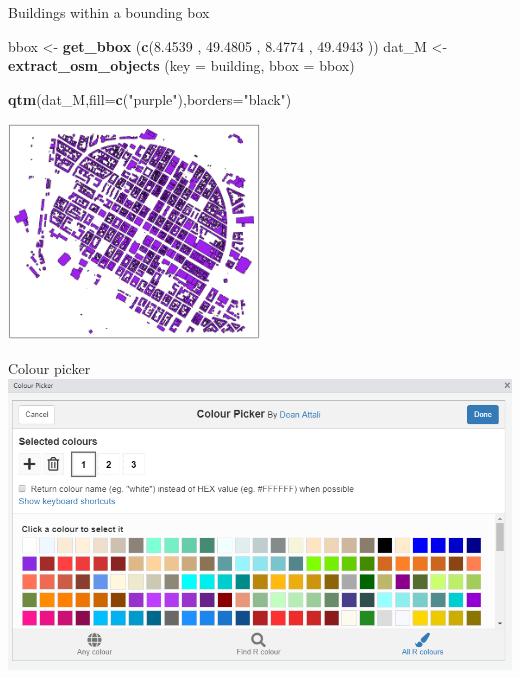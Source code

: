 \documentclass[
  ignorenonframetext,
]{beamer}
\newenvironment{Shaded}{\begin{snugshade}}{\end{snugshade}}
\newcommand{\DataTypeTok}[1]{\textcolor[rgb]{0.13,0.29,0.53}{#1}}
\newcommand{\FloatTok}[1]{\textcolor[rgb]{0.00,0.00,0.81}{#1}}
\newcommand{\KeywordTok}[1]{\textcolor[rgb]{0.13,0.29,0.53}{\textbf{#1}}}
\newcommand{\NormalTok}[1]{#1}
\newcommand{\StringTok}[1]{\textcolor[rgb]{0.31,0.60,0.02}{#1}}
\begin{document}
\begin{frame}[fragile]{Buildings within a bounding box}
\protect\hypertarget{buildings-within-a-bounding-box}{}
\begin{Shaded}
\begin{Highlighting}[]
\NormalTok{bbox \textless{}{-}}\StringTok{ }\KeywordTok{get\_bbox}\NormalTok{ (}\KeywordTok{c}\NormalTok{(}\FloatTok{8.4539}\NormalTok{ , }\FloatTok{49.4805}\NormalTok{  , }
                    \FloatTok{8.4774}\NormalTok{ , }\FloatTok{49.4943}\NormalTok{ ))}
\NormalTok{dat\_M \textless{}{-}}\StringTok{ }\KeywordTok{extract\_osm\_objects}\NormalTok{ (}\DataTypeTok{key =} \StringTok{\textquotesingle{}building\textquotesingle{}}\NormalTok{, }
                              \DataTypeTok{bbox =}\NormalTok{ bbox)}
\end{Highlighting}
\end{Shaded}

\begin{Shaded}
\begin{Highlighting}[]
\KeywordTok{qtm}\NormalTok{(dat\_M,}\DataTypeTok{fill=}\KeywordTok{c}\NormalTok{(}\StringTok{"purple"}\NormalTok{),}\DataTypeTok{borders=}\StringTok{"black"}\NormalTok{)}
\end{Highlighting}
\end{Shaded}

\includegraphics[width=0.5\textwidth,height=\textheight]{pics/bui_mannheim.PNG}
\end{frame}

\begin{frame}{Colour picker}
\protect\hypertarget{colour-picker}{}
\includegraphics{pics/colourpicker.png}
\end{frame}
\end{document}
